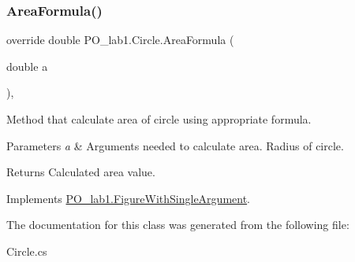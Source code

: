 \subsubsection{\texorpdfstring{Area\+Formula()}{AreaFormula()}}
{\footnotesize\ttfamily override double P\+O\+\_\+lab1.\+Circle.\+Area\+Formula (\begin{DoxyParamCaption}\item[{double}]{a }\end{DoxyParamCaption})\hspace{0.3cm}{\ttfamily [inline]}, {\ttfamily [virtual]}}



Method that calculate area of circle using appropriate formula. 


\begin{DoxyParams}{Parameters}
{\em a} & Arguments needed to calculate area. Radius of circle.\\
\hline
\end{DoxyParams}
\begin{DoxyReturn}{Returns}
Calculated area value.
\end{DoxyReturn}


Implements \mbox{\hyperlink{class_p_o__lab1_1_1_figure_with_single_argument}{P\+O\+\_\+lab1.\+Figure\+With\+Single\+Argument}}.



The documentation for this class was generated from the following file\+:\begin{DoxyCompactItemize}
\item 
Circle.\+cs\end{DoxyCompactItemize}
